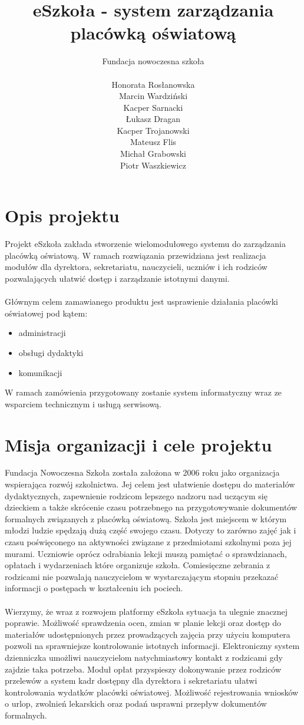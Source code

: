 \documentclass{article}
\author{Fundacja nowoczesna szkoła\\\\
Honorata Rosłanowska \\
Marcin Wardziński\\
Kacper Sarnacki \\
Łukasz Dragan \\
Kacper Trojanowski \\
Mateusz Flis \\
Michał Grabowski \\
Piotr Waszkiewicz}
\title{eSzkoła - system zarządzania placówką oświatową}
\begin{document}
\maketitle
\newpage
\tableofcontents
\newpage

\section{Opis projektu}
Projekt eSzkoła zakłada stworzenie wielomodułowego systemu do zarządzania placówką oświatową. W ramach rozwiązania przewidziana jest realizacja modułów dla dyrektora, sekretariatu, nauczycieli, uczniów i ich rodziców pozwalających ułatwić dostęp i zarządzanie istotnymi danymi. \\ \\
Głównym celem zamawianego produktu jest usprawienie działania placówki oświatowej pod kątem:
\begin{itemize}
    \item administracji
    \item obsługi dydaktyki
    \item komunikacji
\end{itemize}
W ramach zamówienia przygotowany zostanie system informatyczny wraz ze wsparciem technicznym i usługą serwisową.

\section{Misja organizacji i cele projektu}
Fundacja Nowoczesna Szkoła została założona w 2006 roku jako organizacja wspierająca rozwój szkolnictwa. Jej celem jest ułatwienie dostępu do materiałów dydaktycznych, zapewnienie rodzicom lepszego nadzoru nad uczącym się dzieckiem a także skrócenie czasu potrzebnego na przygotowywanie dokumentów formalnych związanych z placówką oświatową. Szkoła jest miejscem w którym młodzi ludzie spędzają dużą część swojego czasu. Dotyczy to zarówno zajęć jak i czasu poświęconego na aktywności związane z przedmiotami szkolnymi poza jej murami. Uczniowie oprócz odrabiania lekcji muszą pamiętać o sprawdzianach, opłatach i wydarzeniach które organizuje szkoła. Comiesięczne zebrania z rodzicami nie pozwalają nauczycielom w wystarczającym stopniu przekazać informacji o postępach w kształceniu ich pociech. \\ \\
Wierzymy, że wraz z rozwojem platformy eSzkoła sytuacja ta ulegnie znacznej poprawie. Możliwość sprawdzenia ocen, zmian w planie lekcji oraz dostęp do materiałów udostępnionych przez prowadzących zajęcia przy użyciu komputera pozwoli na sprawniejsze kontrolowanie istotnych informacji. Elektroniczny system dzienniczka umożliwi nauczycielom natychmiastowy kontakt z rodzicami gdy zajdzie taka potrzeba. Moduł opłat przyspieszy dokonywanie przez rodziców przelewów a system kadr dostępny dla dyrektora i sekretariatu ułatwi kontrolowania wydatków placówki oświatowej. Możliwość rejestrowania wniosków o urlop, zwolnień lekarskich oraz podań usprawni przepływ dokumentów formalnych.
\end{document}
